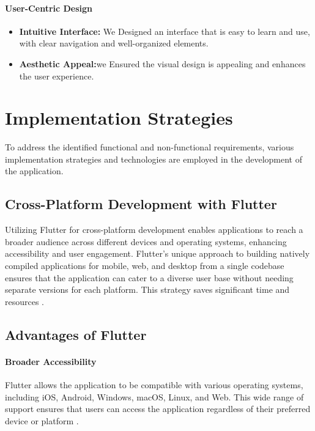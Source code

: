 \paragraph{User-Centric Design}

\begin{itemize}
    \item \textbf{Intuitive Interface:} We  Designed an interface that is easy to learn and use, with clear navigation and well-organized elements.
    \item \textbf{Aesthetic Appeal:}we  Ensured the visual design is appealing and enhances the user experience.
 
\end{itemize}



\section{Implementation Strategies}

To address the identified functional and non-functional requirements, various implementation strategies and technologies are employed in the development of the application.

\subsection{Cross-Platform Development with Flutter}

Utilizing Flutter for cross-platform development enables applications to reach a broader audience across different devices and operating systems, enhancing accessibility and user engagement. Flutter’s unique approach to building natively compiled applications for mobile, web, and desktop from a single codebase ensures that the application can cater to a diverse user base without needing separate versions for each platform. This strategy saves significant time and resources \cite{flutter_overview}.

\subsection{Advantages of Flutter} 

\paragraph{Broader Accessibility} Flutter allows the application to be compatible with various operating systems, including iOS, Android, Windows, macOS, Linux, and Web. This wide range of support ensures that users can access the application regardless of their preferred device or platform .

